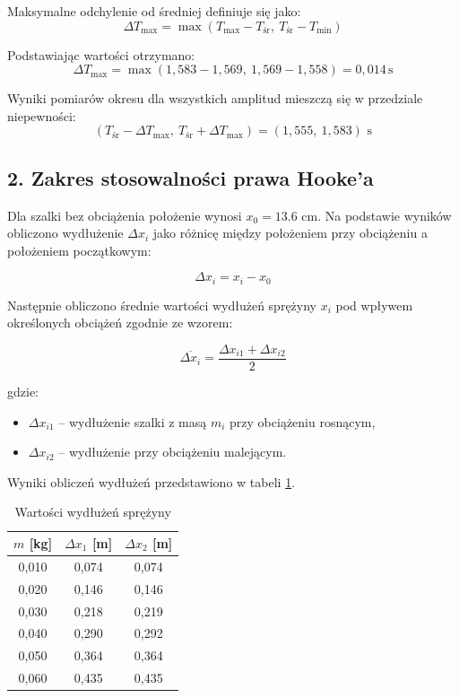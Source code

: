 \documentclass[a4paper,12pt]{article}
\begin{document}
Maksymalne odchylenie od średniej definiuje się jako:
\[
    \Delta T_{\text{max}} = \max\left(T_{\text{max}} - T_{\text{śr}},\ T_{\text{śr}} - T_{\text{min}}\right)
\]

Podstawiając wartości otrzymano:
\[
    \Delta T_{\text{max}} = \max(1{,}583 - 1{,}569,\ 1{,}569 - 1{,}558) = 0{,}014\,\text{s}
\]

Wyniki pomiarów okresu dla wszystkich amplitud mieszczą się w przedziale niepewności:
\[
    (T_{\text{śr}} - \Delta T_{\text{max}},\ T_{\text{śr}} + \Delta T_{\text{max}}) = (1{,}555,\ 1{,}583) \text{ s}
\]

\subsection{2.  Zakres stosowalności prawa Hooke'a}


Dla szalki bez obciążenia położenie wynosi $x_0 = 13.6$ cm.
Na podstawie wyników obliczono wydłużenie $\Delta x_i$ jako różnicę między położeniem przy obciążeniu a położeniem początkowym:

\begin{equation}
    \label{eq:wydluzenie}
    \Delta x_i = x_i - x_0
\end{equation}

Następnie obliczono średnie wartości wydłużeń sprężyny \(x_i\) pod wpływem określonych obciążeń zgodnie ze wzorem:

\begin{equation*}
    \overline{\Delta x_i} = \frac{\Delta x_{i1} + \Delta x_{i2}}{2}
\end{equation*}

gdzie:
\begin{itemize}
    \setlength{\itemsep}{0em}
    \item \(\Delta x_{i1}\) -- wydłużenie szalki z masą \(m_i\) przy obciążeniu rosnącym,
    \item \(\Delta x_{i2}\) -- wydłużenie przy obciążeniu malejącym.
\end{itemize}

Wyniki obliczeń wydłużeń przedstawiono w tabeli \ref{tab:delta_x}.

\begin{table}[H]
    \centering
    \begin{tabular}{|c|c|c|}
        \hline
        $m$ [kg] & $\Delta x_1$ [m] & $\Delta x_2$ [m] \\
        \hline
        0,010 & 0,074 & 0,074 \\
        0,020 & 0,146 & 0,146 \\
        0,030 & 0,218 & 0,219 \\
        0,040 & 0,290 & 0,292 \\
        0,050 & 0,364 & 0,364 \\
        0,060 & 0,435 & 0,435 \\
        \hline
    \end{tabular}
    \caption{Wartości wydłużeń sprężyny}
    \label{tab:delta_x}
\end{table}
\end{document}
